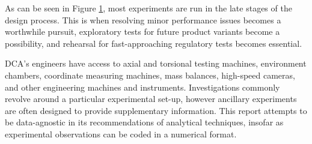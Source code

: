 \documentclass[11pt,a4paper,article]{memoir} %
\begin{document}
\par
As can be seen in Figure \ref{fig:time_of_tests}, most experiments are run in the late stages of the design process. This is when resolving minor performance issues becomes a worthwhile pursuit, exploratory tests for future product variants become a possibility, and rehearsal for fast-approaching regulatory tests becomes essential.
\begin{figure}
\label{fig:time_of_tests}
\end{figure}
\par
DCA's engineers have access to axial and torsional testing machines, environment chambers, coordinate measuring machines, mass balances, high-speed cameras, and other engineering machines and instruments. Investigations commonly revolve around a particular experimental set-up, however ancillary experiments are often designed to provide supplementary information. This report attempts to be data-agnostic in its recommendations of analytical techniques, insofar as experimental observations can be coded in a numerical format.

\end{document}
